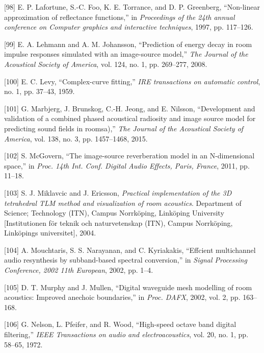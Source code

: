 \documentclass[]{scrreprt}
\begin{document}
\hypertarget{ref-lafortuneux5fnon-linearux5f1997}{}
{[}98{]} E. P. Lafortune, S.-C. Foo, K. E. Torrance, and D. P.
Greenberg, ``Non-linear approximation of reflectance functions,'' in
\emph{Proceedings of the 24th annual conference on Computer graphics and
interactive techniques}, 1997, pp. 117--126.

\hypertarget{ref-lehmannux5fpredictionux5f2008}{}
{[}99{]} E. A. Lehmann and A. M. Johansson, ``Prediction of energy decay
in room impulse responses simulated with an image-source model,''
\emph{The Journal of the Acoustical Society of America}, vol. 124, no.
1, pp. 269--277, 2008.

\hypertarget{ref-levyux5fcomplex-curveux5f1959}{}
{[}100{]} E. C. Levy, ``Complex-curve fitting,'' \emph{IRE transactions
on automatic control}, no. 1, pp. 37--43, 1959.

\hypertarget{ref-marbjergux5fdevelopmentux5f2015}{}
{[}101{]} G. Marbjerg, J. Brunskog, C.-H. Jeong, and E. Nilsson,
``Development and validation of a combined phased acoustical radiosity
and image source model for predicting sound fields in roomsa),''
\emph{The Journal of the Acoustical Society of America}, vol. 138, no.
3, pp. 1457--1468, 2015.

\hypertarget{ref-mcgovernux5fimage-sourceux5f2011}{}
{[}102{]} S. McGovern, ``The image-source reverberation model in an
N-dimensional space,'' in \emph{Proc. 14th Int. Conf. Digital Audio
Effects, Paris, France}, 2011, pp. 11--18.

\hypertarget{ref-miklavcicux5fpracticalux5f2004}{}
{[}103{]} S. J. Miklavcic and J. Ericsson, \emph{Practical
implementation of the 3D tetrahedral TLM method and visualization of
room acoustics}. Department of Science; Technology (ITN), Campus
Norrköping, Linköping University {[}Institutionen för teknik och
naturvetenskap (ITN), Campus Norrköping, Linköpings universitet{]},
2004.

\hypertarget{ref-mouchtarisux5feffcientux5f2002}{}
{[}104{]} A. Mouchtaris, S. S. Narayanan, and C. Kyriakakis, ``Effcient
multichannel audio resynthesis by subband-based spectral conversion,''
in \emph{Signal Processing Conference, 2002 11th European}, 2002, pp.
1--4.

\hypertarget{ref-murphyux5fdigitalux5f2002}{}
{[}105{]} D. T. Murphy and J. Mullen, ``Digital waveguide mesh modelling
of room acoustics: Improved anechoic boundaries,'' in \emph{Proc. DAFX},
2002, vol. 2, pp. 163--168.

\hypertarget{ref-nelsonux5fhigh-speedux5f1972}{}
{[}106{]} G. Nelson, L. Pfeifer, and R. Wood, ``High-speed octave band
digital filtering,'' \emph{IEEE Transactions on audio and
electroacoustics}, vol. 20, no. 1, pp. 58--65, 1972.
\end{document}
